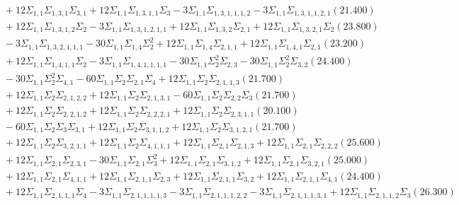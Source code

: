 \documentclass[12pt]{article}
\begin{document}
\begin{landscape}
\begin{align*}
		&\quad\quad +12\Sigma_{1,1}\Sigma_{1,3,1}\Sigma_{3,1}+12\Sigma_{1,1}\Sigma_{1,3,1,1}\Sigma_{3}-3\Sigma_{1,1}\Sigma_{1,3,1,1,1,2}-3\Sigma_{1,1}\Sigma_{1,3,1,1,2,1}(21.400) \\ 
		&\quad\quad +12\Sigma_{1,1}\Sigma_{1,3,1,2}\Sigma_{2}-3\Sigma_{1,1}\Sigma_{1,3,1,2,1,1}+12\Sigma_{1,1}\Sigma_{1,3,2}\Sigma_{2,1}+12\Sigma_{1,1}\Sigma_{1,3,2,1}\Sigma_{2}(23.800) \\ 
		&\quad\quad -3\Sigma_{1,1}\Sigma_{1,3,2,1,1,1}-30\Sigma_{1,1}\Sigma_{1,4}\Sigma_{2}^{2}+12\Sigma_{1,1}\Sigma_{1,4}\Sigma_{2,1,1}+12\Sigma_{1,1}\Sigma_{1,4,1}\Sigma_{2,1}(23.200) \\ 
		&\quad\quad +12\Sigma_{1,1}\Sigma_{1,4,1,1}\Sigma_{2}-3\Sigma_{1,1}\Sigma_{1,4,1,1,1,1}-30\Sigma_{1,1}\Sigma_{2}^{2}\Sigma_{2,3}-30\Sigma_{1,1}\Sigma_{2}^{2}\Sigma_{3,2}(24.400) \\ 
		&\quad\quad -30\Sigma_{1,1}\Sigma_{2}^{2}\Sigma_{4,1}-60\Sigma_{1,1}\Sigma_{2}\Sigma_{2,1}\Sigma_{4}+12\Sigma_{1,1}\Sigma_{2}\Sigma_{2,1,1,3}(21.700) \\ 
		&\quad\quad +12\Sigma_{1,1}\Sigma_{2}\Sigma_{2,1,2,2}+12\Sigma_{1,1}\Sigma_{2}\Sigma_{2,1,3,1}-60\Sigma_{1,1}\Sigma_{2}\Sigma_{2,2}\Sigma_{3}(21.700) \\ 
		&\quad\quad +12\Sigma_{1,1}\Sigma_{2}\Sigma_{2,2,1,2}+12\Sigma_{1,1}\Sigma_{2}\Sigma_{2,2,2,1}+12\Sigma_{1,1}\Sigma_{2}\Sigma_{2,3,1,1}(20.100) \\ 
		&\quad\quad -60\Sigma_{1,1}\Sigma_{2}\Sigma_{3}\Sigma_{3,1}+12\Sigma_{1,1}\Sigma_{2}\Sigma_{3,1,1,2}+12\Sigma_{1,1}\Sigma_{2}\Sigma_{3,1,2,1}(21.700) \\ 
		&\quad\quad +12\Sigma_{1,1}\Sigma_{2}\Sigma_{3,2,1,1}+12\Sigma_{1,1}\Sigma_{2}\Sigma_{4,1,1,1}+12\Sigma_{1,1}\Sigma_{2,1}\Sigma_{2,1,3}+12\Sigma_{1,1}\Sigma_{2,1}\Sigma_{2,2,2}(25.600) \\ 
		&\quad\quad +12\Sigma_{1,1}\Sigma_{2,1}\Sigma_{2,3,1}-30\Sigma_{1,1}\Sigma_{2,1}\Sigma_{3}^{2}+12\Sigma_{1,1}\Sigma_{2,1}\Sigma_{3,1,2}+12\Sigma_{1,1}\Sigma_{2,1}\Sigma_{3,2,1}(25.000) \\ 
		&\quad\quad +12\Sigma_{1,1}\Sigma_{2,1}\Sigma_{4,1,1}+12\Sigma_{1,1}\Sigma_{2,1,1}\Sigma_{2,3}+12\Sigma_{1,1}\Sigma_{2,1,1}\Sigma_{3,2}+12\Sigma_{1,1}\Sigma_{2,1,1}\Sigma_{4,1}(24.400) \\ 
		&\quad\quad +12\Sigma_{1,1}\Sigma_{2,1,1,1}\Sigma_{4}-3\Sigma_{1,1}\Sigma_{2,1,1,1,1,3}-3\Sigma_{1,1}\Sigma_{2,1,1,1,2,2}-3\Sigma_{1,1}\Sigma_{2,1,1,1,3,1}+12\Sigma_{1,1}\Sigma_{2,1,1,2}\Sigma_{3}(26.300) \\ 

\end{align*}
\end{landscape}
\end{document}
